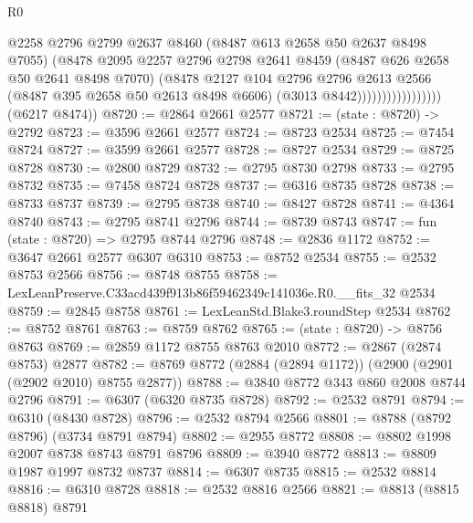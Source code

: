 \begin{lexlean}{R0}
\begin{coremodule}
                                  @2258
                                  @2796
                                  @2799
                                  @2637
                                  @8460
                                  (@8487 @613 @2658 @50 @2637 @8498 @7055)
                                  (@8478
                                    @2095
                                    @2257
                                    @2796
                                    @2798
                                    @2641
                                    @8459
                                    (@8487 @626 @2658 @50 @2641 @8498 @7070)
                                    (@8478
                                      @2127
                                      @104
                                      @2796
                                      @2796
                                      @2613
                                      @2566
                                      (@8487 @395 @2658 @50 @2613 @8498 @6606)
                                      (@3013 @8442)))))))))))))))))
      (@6217 @8474))
@8720 := @2864 @2661 @2577
@8721 := (state : @8720) -> @2792
@8723 := @3596 @2661 @2577
@8724 := @8723 @2534
@8725 := @7454 @8724
@8727 := @3599 @2661 @2577
@8728 := @8727 @2534
@8729 := @8725 @8728
@8730 := @2800 @8729
@8732 := @2795 @8730 @2798
@8733 := @2795 @8732
@8735 := @7458 @8724 @8728
@8737 := @6316 @8735 @8728
@8738 := @8733 @8737
@8739 := @2795 @8738
@8740 := @8427 @8728
@8741 := @4364 @8740
@8743 := @2795 @8741 @2796
@8744 := @8739 @8743
@8747 := fun (state : @8720) => @2795 @8744 @2796
@8748 := @2836 @1172
@8752 := @3647 @2661 @2577 @6307 @6310
@8753 := @8752 @2534
@8755 := @2532 @8753 @2566
@8756 := @8748 @8755
@8758 := LexLeanPreserve.C33acd439f913b86f59462349c141036e.R0.__fits_32 @2534
@8759 := @2845 @8758
@8761 := LexLeanStd.Blake3.roundStep @2534
@8762 := @8752 @8761
@8763 := @8759 @8762
@8765 := (state : @8720) -> @8756 @8763
@8769 := @2859 @1172 @8755 @8763 @2010
@8772 := @2867 (@2874 @8753) @2877
@8782 := @8769 @8772 (@2884 (@2894 @1172)) (@2900 (@2901 (@2902 @2010) @8755 @2877))
@8788 := @3840 @8772 @343 @860 @2008 @8744 @2796
@8791 := @6307 (@6320 @8735 @8728)
@8792 := @2532 @8791
@8794 := @6310 (@8430 @8728)
@8796 := @2532 @8794 @2566
@8801 := @8788 (@8792 @8796) (@3734 @8791 @8794)
@8802 := @2955 @8772
@8808 := @8802 @1998 @2007 @8738 @8743 @8791 @8796
@8809 := @3940 @8772
@8813 := @8809 @1987 @1997 @8732 @8737
@8814 := @6307 @8735
@8815 := @2532 @8814
@8816 := @6310 @8728
@8818 := @2532 @8816 @2566
@8821 := @8813 (@8815 @8818) @8791

\end{coremodule}
\end{lexlean}
